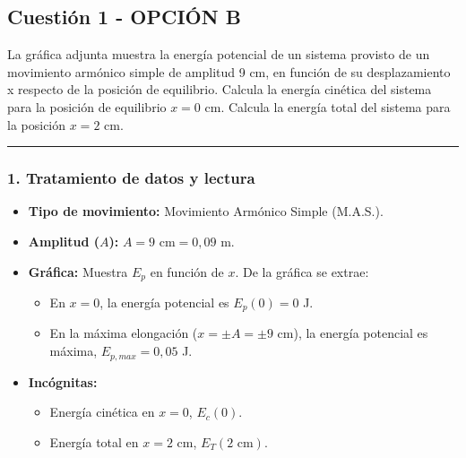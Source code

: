 \subsection{Cuestión 1 - OPCIÓN B}
\label{subsec:2B_2005_sep_cv}

\begin{cajaenunciado}
La gráfica adjunta muestra la energía potencial de un sistema provisto de un movimiento armónico simple de amplitud 9 cm, en función de su desplazamiento x respecto de la posición de equilibrio. Calcula la energía cinética del sistema para la posición de equilibrio $x=0$ cm. Calcula la energía total del sistema para la posición $x=2$ cm.
\end{cajaenunciado}
\hrule

\subsubsection*{1. Tratamiento de datos y lectura}
\begin{itemize}
    \item \textbf{Tipo de movimiento:} Movimiento Armónico Simple (M.A.S.).
    \item \textbf{Amplitud ($A$):} $A = 9 \text{ cm} = 0,09$ m.
    \item \textbf{Gráfica:} Muestra $E_p$ en función de $x$. De la gráfica se extrae:
        \begin{itemize}
            \item En $x=0$, la energía potencial es $E_p(0) = 0$ J.
            \item En la máxima elongación ($x = \pm A = \pm 9$ cm), la energía potencial es máxima, $E_{p,max} = 0,05$ J.
        \end{itemize}
    \item \textbf{Incógnitas:}
    \begin{itemize}
        \item Energía cinética en $x=0$, $E_c(0)$.
        \item Energía total en $x=2$ cm, $E_T(2 \text{ cm})$.
    \end{itemize}
\end{itemize}

